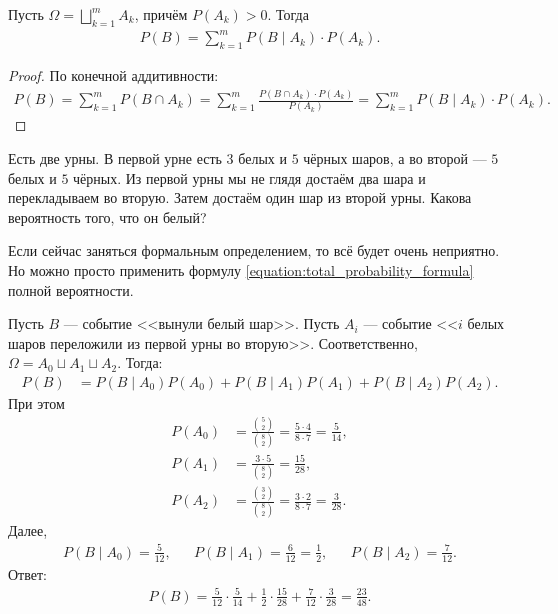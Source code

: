 \begin{prop}
 Пусть $\Omega = \bigsqcup_{k=1}^{m} A_k$, причём $P(A_k) > 0$. Тогда
 \begin{align}
  \label{equation:total_probability_formula}
  P(B) = \sum_{k=1}^{m} P(B \mid A_k) \cdot P(A_k)
 .\end{align} 
\end{prop}
\begin{proof} По конечной аддитивности:
 \begin{align*}
  P(B) = \sum_{k=1}^{m} P(B \cap A_k) = \sum_{k=1}^{m} \frac{P(B \cap A_k) \cdot P(A_k)}{P(A_k)} = \sum_{k=1}^{m} P(B \mid A_k) \cdot P(A_k).
 \end{align*} 
\end{proof}
\begin{exmpl*}
 Есть две урны. В первой урне есть $3$ белых и $5$ чёрных шаров, а во второй --- $5$ белых и $5$ чёрных. Из первой урны мы не глядя достаём два шара и перекладываем во вторую. Затем достаём один шар из второй урны. Какова вероятность того, что он белый?

 Если сейчас заняться формальным определением, то всё будет очень неприятно. Но можно просто применить формулу \eqref{equation:total_probability_formula} полной вероятности.

 Пусть $B$ --- событие <<вынули белый шар>>. Пусть $A_i$ --- событие <<$i$ белых шаров переложили из первой урны во вторую>>. Соответственно, $\Omega = A_0 \sqcup A_1 \sqcup A_2$. Тогда:
 \begin{align*}
  P(B) &= P(B \mid A_0) P(A_0) + P(B \mid A_1) P(A_1) + P(B \mid A_2) P(A_2).
 \end{align*} При этом 
 \begin{align*}
  P(A_0) &= \frac{\binom 5 2}{\binom 8 2} = \frac{5 \cdot 4}{8 \cdot 7} = \frac{5}{14}, \\
  P(A_1) &= \frac{3 \cdot 5}{\binom 8 2} = \frac{15}{28}, \\
  P(A_2) &= \frac{\binom 3 2}{\binom 8 2} = \frac{3 \cdot 2}{8 \cdot 7} = \frac{3}{28}.
 \end{align*} Далее,
 \begin{align*}
  P(B \mid A_0) = \frac{5}{12}, & &P(B \mid A_1) = \frac{6}{12} = \frac{1}{2}, & &P(B \mid A_2) = \frac{7}{12}
 .\end{align*} Ответ:
 \begin{align*}
  P(B)  = \frac{5}{12} \cdot \frac{5}{14} + \frac{1}{2} \cdot \frac{15}{28} + \frac{7}{12} \cdot \frac{3}{28} = \frac{23}{48}.
 \end{align*} 

\end{exmpl*}

